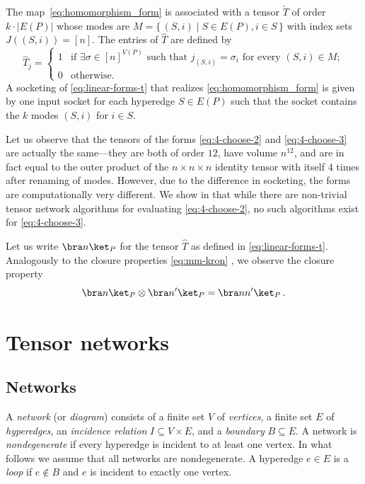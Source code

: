 The map~\eqref{eq:homomorphism_form} is associated with a tensor $\hat{T}$ of 
order $k \cdot |E(P)|$ whose modes are
%
%
$M = \{\,(S,i) \mid S \in E(P), i \in S \,\}$ with index sets
%
$J((S,i)) = [n]$. The entries of $\hat{T}$ are defined by
\begin{equation}
\label{eq:linear-forms-t}
\hat{T}_j=
\begin{cases}
1 & \text{if $\exists \sigma \in [n]^{V(P)}$ such that $j_{(S,i)}=\sigma_i$ for every $(S,i) \in M$};\\
0 & \text{otherwise}.
\end{cases}
\end{equation}
A socketing of \eqref{eq:linear-forms-t} that realizes \eqref{eq:homomorphism_form} is given by one input socket for each hyperedge $S \in E(P)$ such that
the socket contains the $k$ modes $(S,i)$ for $i \in S$.

Let us observe that the tensors of the forms \eqref{eq:4-choose-2} and
\eqref{eq:4-choose-3} are actually the same---they are both of order
$12$, have volume $n^{12}$, and are in fact equal to the outer product
of the $n \times n \times n$ identity tensor with itself $4$ times
after renaming of modes.  However, due to the difference in
socketing, the forms are computationally very different.
We show in  that while there
are non-trivial tensor network algorithms for evaluating
\eqref{eq:4-choose-2}, no such algorithms exist for
\eqref{eq:4-choose-3}.

Let us write $\bra n\ket_P$
for the tensor $\hat{T}$ as defined
in \eqref{eq:linear-forms-t}. Analogously to the closure
properties \eqref{eq:mm-kron} , we observe the
closure property
\begin{equation}
  \label{eq:binom-kron}
  \bra n\ket_P \otimes \bra n'\ket_P = \bra nn'\ket_P\,.
\end{equation}

\section{Tensor networks}
\label{sec:tensor network defs}

\subsection{Networks}

A \emph{network} (or \emph{diagram})
consists of a finite set $V$ of \emph{vertices},
a finite set $E$ of \emph{hyperedges},
an \emph{incidence relation} $I\subseteq V\times E$, and
a \emph{boundary} $B\subseteq E$.
A network is \emph{nondegenerate} if every hyperedge is incident to at least
one vertex. In what follows we assume that all networks are nondegenerate.
A hyperedge $e\in E$ is a \emph{loop} if $e\notin B$ and $e$ is incident
to exactly one vertex.

